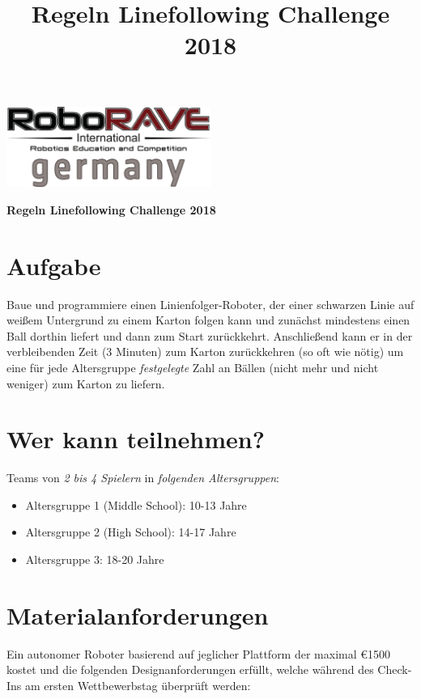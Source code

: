 \documentclass[a4paper,12pt]{article}
\begin{document}
\title{Regeln Linefollowing Challenge 2018}

 \begin{center}
\includegraphics[width=0.5\textwidth]{logo.png}

\huge                      %
\bfseries                   %
Regeln Linefollowing Challenge 2018
  \end{center}
\section{Aufgabe}
Baue und programmiere einen Linienfolger-Roboter, der einer schwarzen Linie auf weißem Untergrund zu
einem Karton folgen kann und zunächst mindestens einen Ball dorthin liefert und dann zum Start zurückkehrt.
Anschließend kann er in der verbleibenden Zeit (3 Minuten) zum Karton zurückkehren (so oft wie nötig) um
eine für jede Altersgruppe \emph{festgelegte} Zahl an Bällen (nicht mehr und nicht weniger) zum Karton zu liefern.
\section{Wer kann teilnehmen?}
Teams von \emph{2 bis 4 Spielern} in \emph{folgenden Altersgruppen}:
\begin{itemize}
		\item Altersgruppe 1 (Middle School): 10-13 Jahre
		\item Altersgruppe 2 (High School): 14-17 Jahre
		\item Altersgruppe 3: 18-20 Jahre
\end{itemize}
\section{Materialanforderungen}
Ein autonomer Roboter basierend auf jeglicher Plattform der maximal \euro{1500} kostet und die folgenden
Designanforderungen erfüllt, welche während des Check-Ins am ersten Wettbewerbstag überprüft werden:
\end{document}
